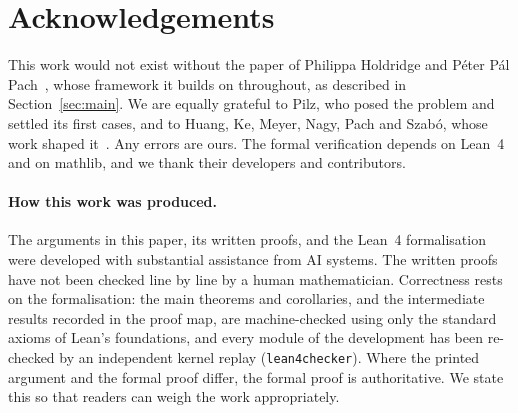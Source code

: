 \documentclass[11pt]{article}
\numberwithin{equation}{section}
\theoremstyle{definition}\newtheorem{definition}[theorem]{Definition}
\theoremstyle{remark}\newtheorem{remark}[theorem]{Remark}
\begin{document}
\section*{Acknowledgements}
This work would not exist without the paper of Philippa Holdridge and
P\'eter P\'al Pach~\cite{HP}, whose framework it builds on throughout,
as described in Section~\ref{sec:main}. We are equally grateful to
Pilz, who posed the problem and settled its first cases, and to Huang,
Ke, Meyer, Nagy, Pach and Szab\'o, whose work shaped
it~\cite{Pilz,HKP,PS,KM,NP}. Any errors are ours. The formal verification
depends on Lean~4 and on mathlib, and we thank their developers and
contributors.

\paragraph{How this work was produced.}
The arguments in this paper, its written proofs, and the Lean~4
formalisation were developed with substantial assistance from AI
systems. The written proofs have not been checked line by line by a
human mathematician. Correctness rests on the formalisation: the main
theorems and corollaries, and the intermediate results recorded in the
proof map, are machine-checked using only the standard axioms of Lean's
foundations, and every module of the development has been re-checked by
an independent kernel replay (\texttt{lean4checker}). Where the printed
argument and the formal proof differ, the formal proof is authoritative.
We state this so that readers can weigh the work appropriately.
\end{document}
